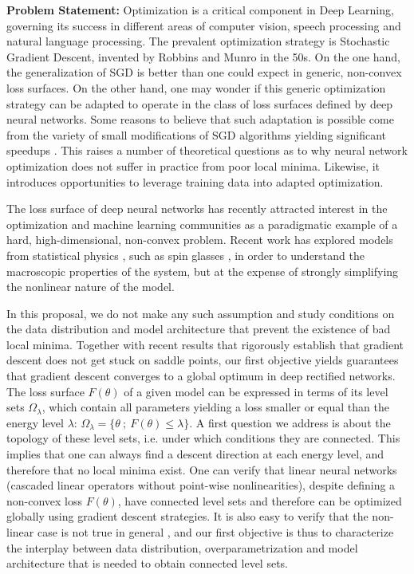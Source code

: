 \documentclass[11pt]{article}
\begin{document}
\vspace{0.5cm}
\noindent
\textbf{Problem Statement:}
Optimization is a critical component in Deep Learning, governing its success in different areas of computer vision, speech processing and natural language processing. The prevalent optimization strategy is Stochastic Gradient Descent, invented by Robbins and Munro in the 50s. On the one hand, the generalization of SGD is better than one could expect 
in generic, non-convex loss surfaces. On the other hand, one may wonder if this generic optimization strategy can be adapted to operate in the class of loss surfaces defined by deep neural networks. Some reasons to believe that such adaptation is possible come from the 
variety of small modifications of SGD algorithms yielding significant speedups \cite{duchi2011adaptive, hinton2012lecture, kingma2014adam}.
This raises a number of theoretical questions as to why neural network optimization does not suffer in practice from poor local minima. Likewise, it introduces opportunities to leverage training data into adapted optimization. 

The loss surface of deep neural networks has recently attracted interest 
in the optimization and machine learning communities as a paradigmatic example of 
a hard, high-dimensional, non-convex problem. 
Recent work has explored models from statistical physics \cite{dauphin2014identifying}, such as spin glasses \cite{choromanska2015loss}, 
in order to understand the macroscopic properties of the system, but at the expense of strongly simplifying the nonlinear nature of the model.

In this proposal, we do not make any such assumption and study conditions 
on the data distribution and model architecture that prevent the existence 
of bad local minima. Together with 
recent results that rigorously establish that gradient descent does not 
get stuck on saddle points, our first objective yields guarantees that gradient descent converges
to a global optimum in deep rectified networks. 
The loss surface $F(\theta)$ of a given model can be expressed in terms of its level sets $\Omega_\lambda$, which contain all parameters yielding a loss smaller or equal than the energy level $\lambda$: $\Omega_\lambda = \{ \theta ~;~F(\theta) \leq \lambda\}$. 
A first question we address is about the topology of these level sets, i.e. under which conditions they are connected. This implies that one can always find a descent direction at each energy level, and therefore that no local minima exist. One can verify that linear neural networks (cascaded linear operators without point-wise nonlinearities), despite defining a non-convex loss $F(\theta)$, have connected level sets and therefore can be optimized globally using gradient descent strategies. It is also easy to verify that the non-linear case is not true in general \cite{shamir}, and our first objective is thus to characterize the interplay between data distribution, overparametrization and model architecture that is needed to obtain connected level sets. 
\end{document}
